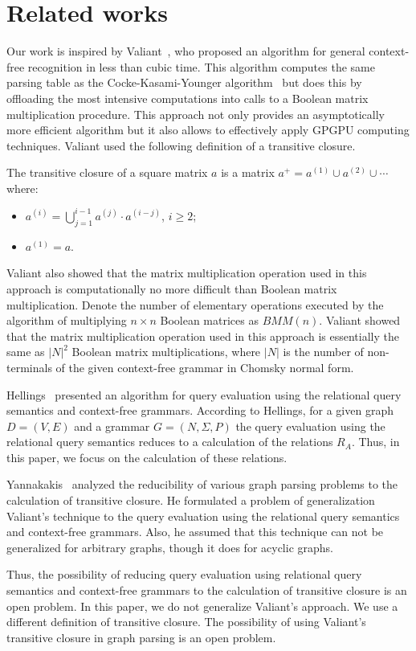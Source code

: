 \section{Related works} \label{section_related}
Our work is inspired by Valiant~\cite{valiant}, who proposed an algorithm for general context-free recognition in less than cubic time. This algorithm computes the same parsing table as the Cocke-Kasami-Younger algorithm~\cite{kasami, younger} but does this by offloading the most intensive computations into calls to a Boolean matrix multiplication procedure. This approach not only provides an asymptotically more efficient algorithm but it also allows to effectively apply GPGPU computing techniques. Valiant used the following definition of a transitive closure.

\begin{mydef}
The transitive closure of a square matrix $a$ is a matrix $a^+ = a^{(1)} \cup a^{(2)} \cup \cdots$ where:
\begin{itemize}
    \item $a^{(i)} = \bigcup^{i-1}_{j=1}{a^{(j)} \cdot a^{(i - j)}}$, $i \ge 2$;
    \item $a^{(1)} = a$.
\end{itemize}
\end{mydef}

Valiant also showed that the matrix multiplication operation used in this approach is computationally no more difficult than Boolean matrix multiplication. Denote the number of elementary operations executed by the algorithm of multiplying $n \times n$ Boolean matrices as $BMM(n)$. Valiant showed that the matrix multiplication operation used in this approach is essentially the same as $|N|^2$ Boolean matrix multiplications, where $|N|$ is the number of non-terminals of the given context-free grammar in Chomsky normal form.

Hellings~\cite{hellingsRelational} presented an algorithm for query evaluation using the relational query semantics and context-free grammars. According to Hellings, for a given graph $D = (V, E)$ and a grammar $G = (N, \Sigma, P)$ the query evaluation using the relational query semantics reduces to a calculation of the relations $R_A$. Thus, in this paper, we focus on the calculation of these relations.

Yannakakis~\cite{transitive-closure} analyzed the reducibility of various graph parsing problems to the calculation of transitive closure. He formulated a problem of generalization Valiant's technique to the query evaluation using the relational query semantics and context-free grammars. Also, he assumed that this technique can not be generalized for arbitrary graphs, though it does for acyclic graphs.

Thus, the possibility of reducing query evaluation using relational query semantics and context-free grammars to the calculation of transitive closure is an open problem. In this paper, we do not generalize Valiant's approach. We use a different definition of transitive closure. The possibility of using Valiant's transitive closure in graph parsing is an open problem.